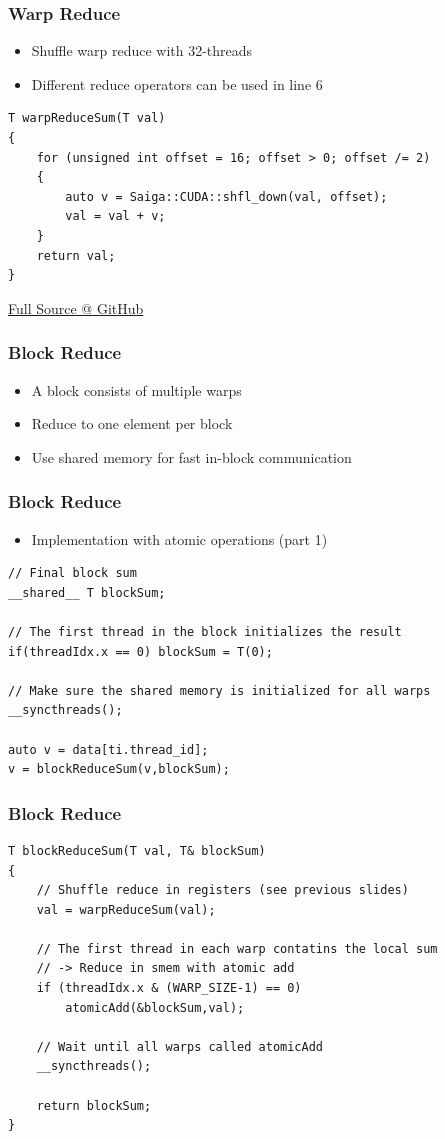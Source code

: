 \documentclass[aspectratio=169,handout]{beamer}
\begin{document}
\begin{frame}[fragile]
\frametitle{Warp Reduce}
\begin{itemize}
	\item Shuffle warp reduce with 32-threads
	\item Different reduce operators can be used in line 6
\end{itemize}

\begin{lstlisting}
T warpReduceSum(T val)
{
	for (unsigned int offset = 16; offset > 0; offset /= 2)
	{
		auto v = Saiga::CUDA::shfl_down(val, offset);
		val = val + v;
	}
	return val;
}
\end{lstlisting}

\href{https://github.com/darglein/saiga/blob/master/samples/cuda/reduce/main.cu}{Full Source @ GitHub}
\end{frame}

\begin{frame}[fragile]
\frametitle{Block Reduce}
\begin{itemize}
	\item A block consists of multiple warps
	\item<2->[$\rightarrow$] Reduce to one element per block
	\item<3->[$\rightarrow$] Use shared memory for fast in-block communication
\end{itemize}


\end{frame}

\begin{frame}[fragile]
\frametitle{Block Reduce}
\begin{itemize}
	\item Implementation with atomic operations (part 1)
\end{itemize}

\begin{lstlisting}
// Final block sum
__shared__ T blockSum;

// The first thread in the block initializes the result
if(threadIdx.x == 0) blockSum = T(0);

// Make sure the shared memory is initialized for all warps
__syncthreads();

auto v = data[ti.thread_id];
v = blockReduceSum(v,blockSum);
\end{lstlisting}
\end{frame}


\begin{frame}[fragile]
\frametitle{Block Reduce}
\begin{lstlisting}
T blockReduceSum(T val, T& blockSum)
{
	// Shuffle reduce in registers (see previous slides)
	val = warpReduceSum(val);

	// The first thread in each warp contatins the local sum
	// -> Reduce in smem with atomic add
	if (threadIdx.x & (WARP_SIZE-1) == 0)
		atomicAdd(&blockSum,val);
		
	// Wait until all warps called atomicAdd
	__syncthreads();

	return blockSum;
}
\end{lstlisting}
\end{frame}
\end{document}
